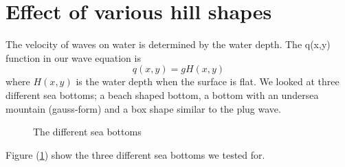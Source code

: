 \section{Effect of various hill shapes}
The velocity of waves on water is determined by the water depth. The q(x,y) function in our wave equation is
\begin{equation}
 q(x,y) = gH(x,y)
\end{equation}
where $H(x,y)$ is the water depth when the surface is flat.
We looked at three different sea bottoms; a beach shaped bottom, a bottom with an undersea mountain (gauss-form) and a box shape similar to the plug wave.

\begin{figure}[H]
\caption{The different sea bottoms}
\label{bottoms}

 \end{figure}

 Figure (\ref{bottoms}) show the three different sea bottoms we tested for. 
 
